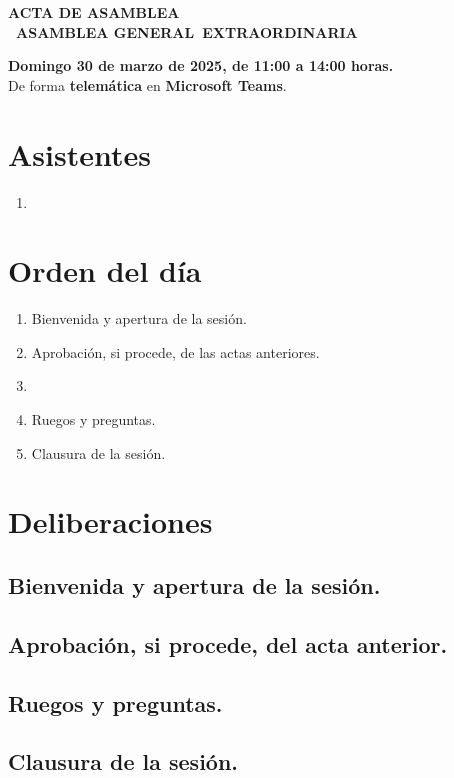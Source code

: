 \documentclass[a4paper,12pt]{article}
\newcommand{\assemblyType}{Extraordinaria}
\newcommand{\assemblyDate}{Domingo 30 de marzo de 2025, de 11:00 a 14:00 horas.}
\newcommand{\assemblyPresence}{telemática}
\newcommand{\assemblyUbication}{Microsoft Teams}
\newcommand{\headerSubject}{ACTA DE ASAMBLEA}
\newcommand{\assemblyNumber}{1} %
\newcommand{\assemblyName}{\Romannum{\assemblyNumber}~Asamblea General~\assemblyType}
\newcommand{\subject}{\headerSubject \\ \MakeUppercase{\assemblyName}}
\begin{document}
\begin{center}
    \large \textbf{\subject}
\end{center}

\begin{center}
    \textbf{\assemblyDate}\\
    De forma \textbf{\assemblyPresence} en \textbf{\assemblyUbication}.
\end{center}

\vspace{0.5cm}

\tableofcontents
\newpage
{}

\section{Asistentes}

\begin{multicols}{2}
\begin{enumerate}
    \item[]
\end{enumerate}
\end{multicols}

\section{Orden del día}

\begin{enumerate}
    \item Bienvenida y apertura de la sesión.
    \item Aprobación, si procede, de las actas anteriores.
    \item
    \item Ruegos y preguntas.
    \item Clausura de la sesión.
\end{enumerate}

\section{Deliberaciones}

\subsection{Bienvenida y apertura de la sesión.}

\subsection{Aprobación, si procede, del acta anterior.}

\subsection{}

\subsection{Ruegos y preguntas.}

\subsection{Clausura de la sesión.}

\firma
\end{document}
